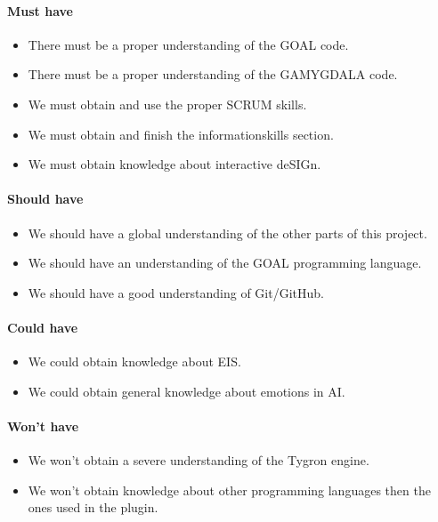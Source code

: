 \paragraph{Must have} 
\begin{itemize}
\item There must be a proper understanding of the \gls{GOAL} code.
\item There must be a proper understanding of the \gls{GAMYGDALA} code.
\item We must obtain and use the proper \gls{SCRUM} skills.
\item We must obtain and finish the informationskills section.
\item We must obtain knowledge about interactive de\gls{SIG}n.
\end{itemize}

\paragraph{Should have} 
\begin{itemize}
\item We should have a global understanding of the other parts of this project.
\item We should have an understanding of the \gls{GOAL} programming language.
\item We should have a good understanding of Git/GitHub.
\end{itemize}

\paragraph{Could have} 
\begin{itemize}
\item We could obtain knowledge about EIS.
\item We could obtain general knowledge about emotions in AI.
\end{itemize}

\paragraph{Won't have} 
\begin{itemize}
\item We won't obtain a severe understanding of the \gls{Tygron} engine.
\item We won't obtain knowledge about other programming languages then the ones used in the plugin.
\end{itemize}

